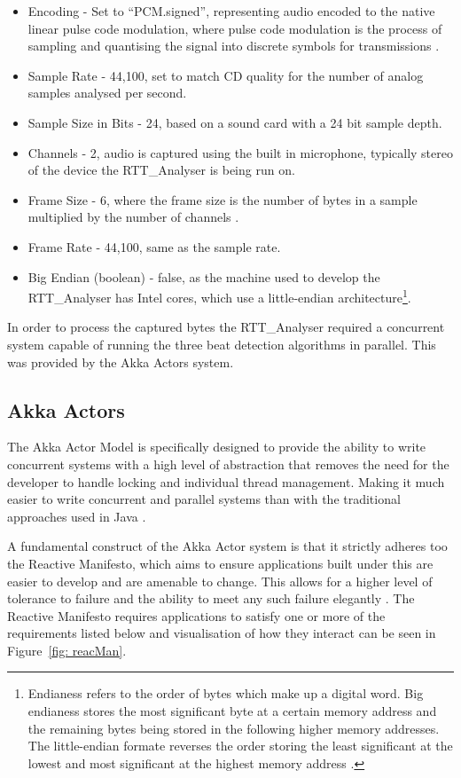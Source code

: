 \documentclass[a4paper, 11pt]{article}
\begin{document}
\begin{itemize}
\item Encoding - Set to ``PCM.signed'', representing audio encoded to the native linear pulse code modulation, where pulse code modulation is the process of sampling and quantising the signal into discrete symbols for transmissions \cite{pulseWag}.
\item Sample Rate - 44,100, set to match CD quality for the number of analog samples analysed per second. 
\item Sample Size in Bits - 24, based on a sound card with a 24 bit sample depth.
\item Channels - 2, audio is captured using the built in microphone, typically stereo of the device the RTT\_Analyser is being run on.
\item Frame Size - 6, where the frame size is the number of bytes in a sample multiplied by the number of channels \cite{audioFormat}.
\item Frame Rate - 44,100, same as the sample rate.
\item Big Endian (boolean) - false, as the machine used to develop the RTT\_Analyser has Intel cores, which use a little-endian architecture\footnote{Endianess refers to the order of bytes which make up a digital word. Big endianess stores the most significant byte at a certain memory address and the remaining bytes being stored in the following higher memory addresses. The little-endian formate reverses the order storing the least significant at the lowest and most significant at the highest memory address \cite{endiness}.}.
\end{itemize}

In order to process the captured bytes the RTT\_Analyser required a concurrent system capable of running the three beat detection algorithms in parallel. This was provided by the Akka Actors system.

\subsection{Akka Actors}
The Akka Actor Model is specifically designed to provide the ability to write concurrent systems with a high level of abstraction that removes the need for the developer to handle locking and individual thread management. Making it much easier to write concurrent and parallel systems than with the traditional approaches used in Java \cite{akkaActors}.

A fundamental construct of the Akka Actor system is that it strictly adheres too the Reactive Manifesto, which aims to ensure applications built under this are easier to develop and are amenable to change. This allows for a higher level of tolerance to failure and the ability to meet any such failure elegantly \cite{reactMan}. The Reactive Manifesto requires applications to satisfy one or more of the requirements listed below \cite{reactMan} and visualisation of how they interact can be seen in Figure~\ref{fig: reacMan}.
\end{document}
